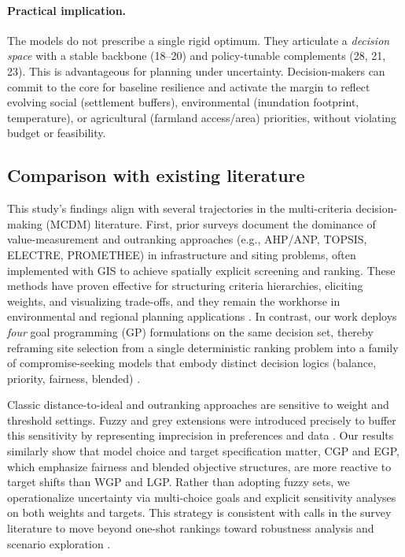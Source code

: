 \paragraph{Practical implication.}
The models do not prescribe a single rigid optimum. They articulate a \textit{decision space} with a stable backbone (18--20) and policy-tunable complements (28, 21, 23). This is advantageous for planning under uncertainty. Decision-makers can commit to the core for baseline resilience and activate the margin to reflect evolving social (settlement buffers), environmental (inundation footprint, temperature), or agricultural (farmland access/area) priorities, without violating budget or feasibility.


\subsection{Comparison with existing literature}
This study's findings align with several trajectories in the multi-criteria decision-making (MCDM) literature. First, prior surveys document the dominance of value-measurement and outranking approaches (e.g., AHP/ANP, TOPSIS, ELECTRE, PROMETHEE) in infrastructure and siting problems, often implemented with GIS to achieve spatially explicit screening and ranking. These methods have proven effective for structuring criteria hierarchies, eliciting weights, and visualizing trade-offs, and they remain the workhorse in environmental and regional planning applications \cite{ajis2013115,encyclopedia3010006}. In contrast, our work deploys \textit{four} goal programming (GP) formulations on the same decision set, thereby reframing site selection from a single deterministic ranking problem into a family of compromise-seeking models that embody distinct decision logics (balance, priority, fairness, blended) \cite{JonesTamiz2010_PracticalGP}.

Classic distance-to-ideal and outranking approaches are sensitive to weight and threshold settings. Fuzzy and grey extensions were introduced precisely to buffer this sensitivity by representing imprecision in preferences and data \cite{LIANG1999682,MARDANI20154126}. Our results similarly show that model choice and target specification matter, CGP and EGP, which emphasize fairness and blended objective structures, are more reactive to target shifts than WGP and LGP. Rather than adopting fuzzy sets, we operationalize uncertainty via multi-choice goals and explicit sensitivity analyses on both weights and targets. This strategy is consistent with calls in the survey literature to move beyond one-shot rankings toward robustness analysis and scenario exploration \cite{ajis2013115,encyclopedia3010006}.

